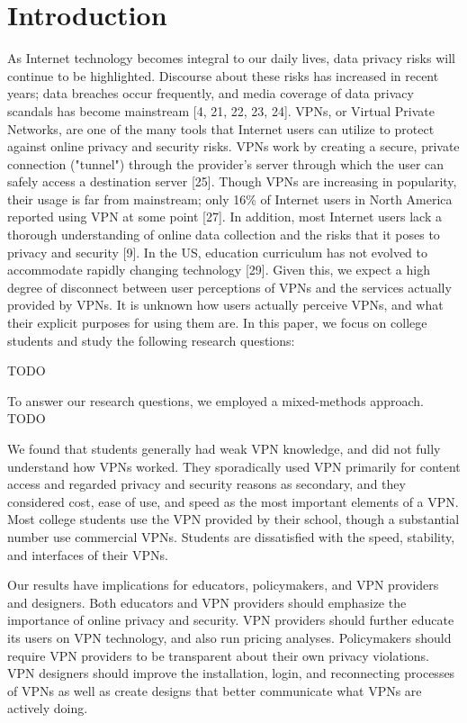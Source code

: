 \section{Introduction}

As Internet technology becomes integral to our daily lives, data privacy risks
will continue to be highlighted. Discourse about these risks has increased in
recent years; data breaches occur frequently, and media coverage of data
privacy scandals has become mainstream [4, 21, 22, 23, 24]. VPNs, or Virtual
Private Networks, are one of the many tools that Internet users can utilize to
protect against online privacy and security risks. VPNs work by creating a
secure, private connection ("tunnel") through the provider's server through
which the user can safely access a destination server [25]. Though VPNs are
increasing in popularity, their usage is far from mainstream; only 16\% of
Internet users in North America reported using VPN at some point [27]. In
addition, most Internet users lack a thorough understanding of online data
collection and the risks that it poses to privacy and security [9]. In the US,
education curriculum has not evolved to accommodate rapidly changing
technology [29]. Given this, we expect a high degree of disconnect between
user perceptions of VPNs and the services actually provided by VPNs. It is
unknown how users actually perceive VPNs, and what their explicit purposes for
using them are. In this paper, we focus on college students and study the
following research questions:

TODO

To answer our research questions, we employed a mixed-methods approach. TODO

We found that students generally had weak VPN knowledge, and did not fully
understand how VPNs worked. They sporadically used VPN primarily for content
access and regarded privacy and security reasons as secondary, and they
considered cost, ease of use, and speed as the most important elements of a
VPN. Most college students use the VPN provided by their school, though a
substantial number use commercial VPNs. Students are dissatisfied with the
speed, stability, and interfaces of their VPNs.

Our results have implications for educators, policymakers, and VPN providers
and designers. Both educators and VPN providers should emphasize the
importance of online privacy and security. VPN providers should further
educate its users on VPN technology, and also run pricing analyses.
Policymakers should require VPN providers to be transparent about their own
privacy violations. VPN designers should improve the installation, login, and
reconnecting processes of VPNs as well as create designs that better
communicate what VPNs are actively doing.


